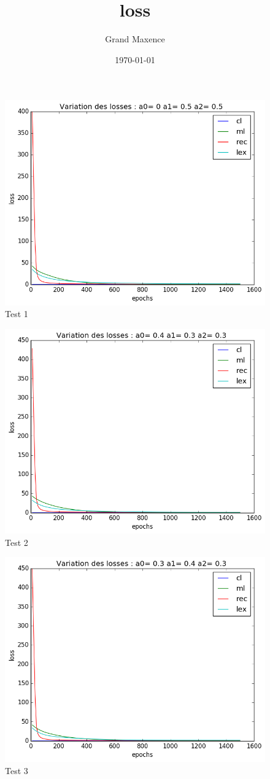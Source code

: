 \documentclass{article}
\title{loss}
\author{Grand Maxence}
\date{\today}
\begin{document}
\maketitle
\begin{figure}[!h]
  \centering
  \includegraphics[scale=0.8]{img/loss/test1.png}
  \caption{Test 1}
\end{figure}
\begin{figure}[!h]
  \centering
  \includegraphics[scale=0.8]{img/loss/test2.png}
  \caption{Test 2}
\end{figure}
\begin{figure}[!h]
  \centering
  \includegraphics[scale=0.8]{img/loss/test3.png}
  \caption{Test 3}
\end{figure}
\end{document}
